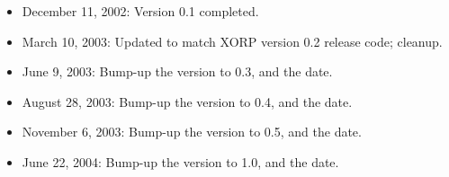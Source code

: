\documentclass[11pt]{article}
\begin{document}
\begin{itemize}

  \item December 11, 2002: Version 0.1 completed.

  \item March 10, 2003: Updated to match XORP version 0.2 release code;
  cleanup.

  \item June 9, 2003: Bump-up the version to 0.3, and the date.

  \item August 28, 2003: Bump-up the version to 0.4, and the date.

  \item November 6, 2003: Bump-up the version to 0.5, and the date.

  \item June 22, 2004: Bump-up the version to 1.0, and the date.

\end{itemize}





\end{document}
